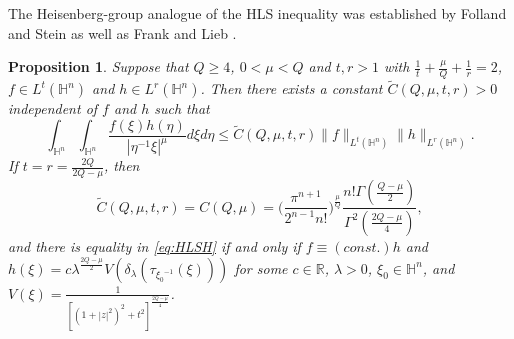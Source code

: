 \documentclass[11pt]{article}
\newtheorem{proposition}{Proposition}[section]
\begin{document}
{The Heisenberg-group analogue of the HLS inequality was established} by Folland and Stein \cite{FS74} as well as Frank and Lieb \cite{FL12}.
\begin{proposition}\label{pro:HLS}
 Suppose that $Q\geq 4$, $0<\mu< Q$ and $t,r>1$ with $\frac{1}{t}+\frac{\mu}{Q}+\frac{1}{r}=2$, $f\in L^{t}(\mathbb{H}^{n})$ and $h\in L^{r}(\mathbb{H}^{n})$. Then there exists a constant $\widetilde{C}(Q,\mu,t,r)>0$ independent of $f$ and $h$ such that
 \begin{equation}\label{eq:HLSH} \int_{\mathbb{H}^{n}}\int_{\mathbb{H}^{n}}\frac{f(\xi)h(\eta)}{|\eta^{-1}\xi|^{\mu}}
d\xi{d}\eta\leq \widetilde{C}(Q,\mu,t,r)\|f\|_{L^t(\mathbb{H}^{n})}\|h\|_{L^r(\mathbb{H}^{n})}.
 \end{equation}
 If $t=r=\frac{2Q}{2Q-\mu}$, then
\begin{equation*}
 \widetilde{C}(Q,\mu,t,r)=C(Q,\mu)=\bigg(\frac{\pi^{n+1}}{2^{n-1}n!}\bigg)^{\frac{\mu}{Q}}
 \frac{n!\Gamma(\frac{Q-\mu}{2})}{\Gamma^2(\frac{2Q-\mu}{4})},
\end{equation*}
and there is equality in \eqref{eq:HLSH} if and only if $f\equiv (const.)h$ and $h(\xi)=c\lambda^{\frac{2Q-\mu}{2}}V(\delta_\lambda(\tau_{{\xi_0}^{-1}}(\xi)))$ for some $c\in \mathbb{R}$, $\lambda>0$, $\xi_{0}\in\mathbb{H}^{n}$, and $V(\xi)=\frac{1}{[(1+|z|^{2})^{2}+t^{2}]^{\frac{2Q-\mu}{4}}}$.
\end{proposition}
\end{document}
